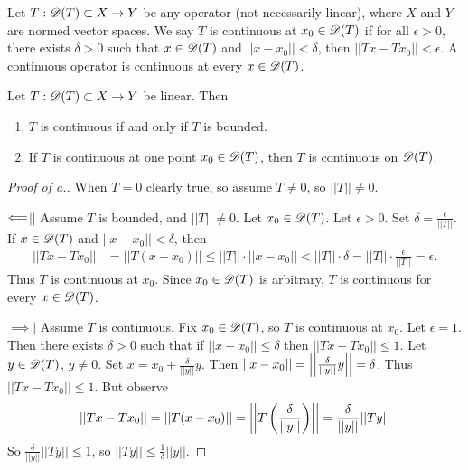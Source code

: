 \documentclass[]{article}
\begin{document}
\begin{definition}
	Let $T:\mathscr{D}(T)\subset X\rightarrow Y$ be any operator (not necessarily linear), where $X$ and $Y$ are normed vector spaces.
	We say $T$ is continuous at $x_0\in\mathscr{D}(T)$ if for all $\epsilon>0$, there exists $\delta>0$ such that $x\in\mathscr{D}(T)$ and $||x-x_0||<\delta$, then $||Tx-Tx_0||<\epsilon$.
	A continuous operator is continuous at every $x\in\mathscr{D}(T)$.
\end{definition}
\begin{theorem}
	Let $T:\mathscr{D}(T)\subset X\rightarrow Y$ be linear.
	Then
	\begin{enumerate}
		\item[a.] $T$ is continuous if and only if $T$ is bounded.
		\item[b.] If $T$ is continuous at one point $x_0\in\mathscr{D}(T)$, then $T$ is continuous on $\mathscr{D}(T)$.
	\end{enumerate}
\end{theorem}
\begin{proof}
	[Proof of a.]
	When $T=0$ clearly true, so assume $T\neq0$, so $||T||\neq0$.

	\ul{$\Longleftarrow$}$\mid|$ Assume $T$ is bounded, and $||T||\neq0$.
	Let $x_0\in\mathscr{D}(T)$. Let $\epsilon>0$. Set $\delta=\frac\epsilon{||T||}$.
	If $x\in\mathscr{D}(T)$ and $||x-x_0||<\delta$, then 
	\begin{align*}
		||Tx-Tx_0|| &= ||T(x-x_0)||
					\leq ||T||\cdot||x-x_0||
					< ||T||\cdot\delta
					= ||T||\cdot\frac\epsilon{||T||}=\epsilon.
	\end{align*}
	Thus $T$ is continuous at $x_0$.
	Since $x_0\in\mathscr{D}(T)$ is arbitrary, $T$ is continuous for every $x\in\mathscr{D}(T)$.
	
	\ul{$\implies$}$\mid$ Assume $T$ is continuous.
	Fix $x_0\in\mathscr{D}(T)$, so $T$ is continuous at $x_0$. Let $\epsilon=1$.
	Then there exists $\delta>0$ such that if $||x-x_0||\leq\delta$ then $||Tx-Tx_0||\leq1$.
	Let $y\in\mathscr{D}(T)$, $y\neq0$.
	Set $x=x_0+\frac\delta{||y||}y$. Then $||x-x_0|| = \left|\left|\frac\delta{||y||}y\right|\right|=\delta$.
	Thus $||Tx-Tx_0||\leq 1$. But observe
	\begin{align*}
		||Tx-Tx_0|| = ||T(x-x_0)||
					= \left|\left|T\left(\frac\delta{||y||}\right)\right|\right|
					= \frac\delta{||y||}||Ty||
	\end{align*}
	So $\frac\delta{||y||}||Ty||\leq1$, so $||Ty||\leq\frac1\delta||y||$.
\end{proof}
\end{document}
